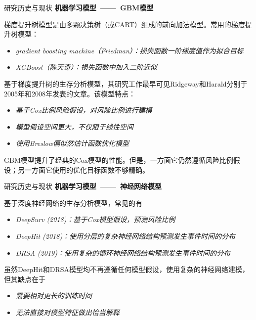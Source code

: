 \documentclass[10pt]{beamer}
\begin{document}
\begin{frame}{研究历史与现状}
  \textbf{机器学习模型\ ——\ GBM模型}

  梯度提升树模型是由多颗决策树（或CART）组成的前向加法模型。常用的梯度提升树模型：
  \begin{itemize}
    \item \textit{gradient boosting machine（Friedman）：损失函数一阶梯度值作为拟合目标}
    \item \textit{XGBoost（陈天奇）：损失函数中加入二阶近似}
  \end{itemize}

  基于梯度提升树的生存分析模型，其研究工作最早可见Ridgeway和Harald分别于2005年和2008年发表的文章。该模型特点：
  \begin{itemize}
    \item \textit{基于Cox比例风险假设，对风险比例进行建模}
    \item \textit{模型假设空间更大，不仅限于线性空间}
    \item \textit{使用Breslow偏似然估计函数优化模型}
  \end{itemize}

  GBM模型提升了经典的Cox模型的性能。但是，一方面它仍然遵循风险比例假设；另一方面它使用的优化目标函数不够精确。

\end{frame}

\begin{frame}{研究历史与现状}
  \textbf{机器学习模型\ ——\ 神经网络模型}

  基于深度神经网络的生存分析模型，常见的有
  \begin{itemize}
    \item \textit{DeepSurv (2018)：基于Cox模型假设，预测风险比例}
    \item \textit{DeepHit (2018)：使用分层的复杂神经网络结构预测发生事件时间的分布}
    \item \textit{DRSA (2019)：使用复杂的循环神经网络结构预测发生事件时间的分布}
  \end{itemize}

  虽然DeepHit和DRSA模型均不再遵循任何模型假设，使用复杂的神经网络建模，但其缺点在于
  \begin{itemize}
    \item \textit{需要相对更长的训练时间}
    \item \textit{无法直接对模型特征做出恰当解释}
  \end{itemize}

\end{frame}
\end{document}
